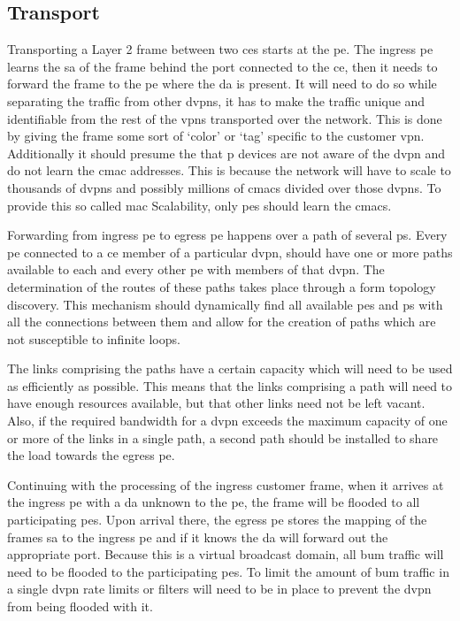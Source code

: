 
\subsection{Transport} %
\label{sub:transport}

Transporting a Layer 2 frame between two \acp{ce} starts at the \ac{pe}. The ingress \ac{pe} learns the \ac{sa} of the frame behind the port connected to the \ac{ce}, then it needs to forward the frame to the \ac{pe} where the \ac{da} is present. It will need to do so while separating the traffic from other \acp{dvpn}, it has to make the traffic unique and identifiable from the rest of the \acp{vpn} transported over the network. This is done by giving the frame some sort of `color' or `tag' specific to the customer \ac{vpn}. Additionally it should presume the that \ac{p} devices are not aware of the \ac{dvpn} and do not learn the \ac{cmac} addresses. This is because the network will have to scale to thousands of \acp{dvpn} and possibly millions of \acp{cmac} divided over those \acp{dvpn}. To provide this so called \acs{mac} Scalability, only \acp{pe} should learn the \acp{cmac}.

Forwarding from ingress \ac{pe} to egress \ac{pe} happens over a path of several \acp{p}. Every \ac{pe} connected to a \ac{ce} member of a particular \ac{dvpn}, should have one or more paths available to each and every other \ac{pe} with members of that \ac{dvpn}. The determination of the routes of these paths takes place through a form topology discovery. This mechanism should dynamically find all available \acp{pe} and \acp{p} with all the connections between them and allow for the creation of paths which are not susceptible to infinite loops.

The links comprising the paths have a certain capacity which will need to be used as efficiently as possible. This means that the links comprising a path will need to have enough resources available, but that other links need not be left vacant. Also, if the required bandwidth for a \ac{dvpn} exceeds the maximum capacity of one or more of the links in a single path, a second path should be installed to share the load towards the egress \ac{pe}. 

Continuing with the processing of the ingress customer frame, when it arrives at the ingress \ac{pe} with a \ac{da} unknown to the \ac{pe}, the frame will be flooded to all participating \acp{pe}. Upon arrival there, the egress \ac{pe} stores the mapping of the frames \ac{sa} to the ingress \ac{pe} and if it knows the \ac{da} will forward out the appropriate port. Because this is a virtual broadcast domain, all \ac{bum} traffic will need to be flooded to the participating \acp{pe}. To limit the amount of \ac{bum} traffic in a single \ac{dvpn} rate limits or filters will need to be in place to prevent the \ac{dvpn} from being flooded with it.

